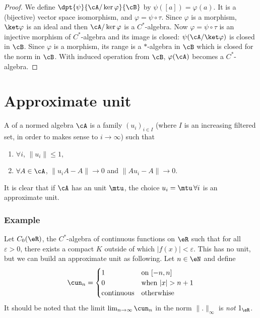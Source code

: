 \begin{proof}
	We  define $\dpt{\psi}{\cA/\ker\varphi}{\cB}$ by $\psi([a])=\varphi(a)$. It is a (bijective) vector space isomorphism, and $\varphi=\psi\circ\tau$. Since $\varphi$ is a morphism, $\ket \varphi$ is an ideal and then $\cA/\ker\varphi$ is a $C^*$-algebra. Now $\varphi=\psi\circ\tau$ is an injective morphism of $C^*$-algebra and its image is closed: $\psi(\cA/\ket\varphi)$ is closed in $\cB$. Since $\varphi$ is a morphism, its range is a $*$-algebra in $\cB$ which is closed for the norm in $\cB$. With induced operation from $\cB$, $\varphi(\cA)$ becomes a $C^*$-algebra.
\end{proof}

\section{Approximate unit}

\begin{definition}
	A  of a normed algebra $\cA$ is a family $(u_i)_{i\in I}$ (where $I$ is an increasing filtered set, in order to makes sense to $i\to\infty$) such
	that
	\begin{enumerate}
		\item  $\forall i$, $\|u_i\|\leq 1$,
		\item  $\forall A\in\cA$, $\|u_iA-A\|\to 0$ and $\|Au_i-A\|\to 0$. \label{enuoii}
	\end{enumerate}
	\label{def:app_unit}
\end{definition}
It is clear that if $\cA$ has an unit $\mtu$, the choice $u_i=\mtu\,\forall i$ is an approximate unit.

\subsubsection*{Example}

Let $C_0(\eR)$, the $C^*$-algebra of continuous functions on $\eR$ such that for all $\varepsilon>0$, there exists a compact $K$ outside of which $| f(x) |<\varepsilon$. This has no unit, but we can build an approximate unit as following. Let $n\in\eN$ and define
\[
	\cun_n=
	\begin{cases}
		1                   & \textrm{on $[-n,n]$}      \\
		0                   & \textrm{when $| x |>n+1$} \\
		\textrm{continuous} & \textrm{otherwhise}
	\end{cases}
\]
It should be noted that the limit $\lim_{n\to\infty}\cun_n$ in the norm  $\| . \|_{\infty}$ is \emph{not} $1_{\eR}$.


